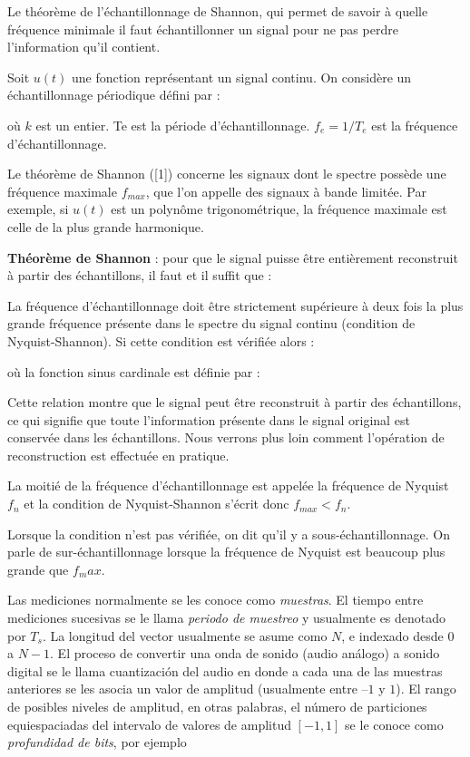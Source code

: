 \documentclass[conference,onecolumn]{IEEEtran}
\begin{document}
Le théorème de l'échantillonnage de Shannon, qui permet de savoir à quelle fréquence minimale il faut échantillonner un signal pour ne pas perdre l'information qu'il contient. 

Soit $u(t)$ une fonction représentant un signal continu. On considère un échantillonnage périodique défini par : 

où $k$ est un entier. Te est la période d'échantillonnage. $f_e=1/T_e$ est la fréquence d'échantillonnage. 

Le théorème de Shannon ([1]) concerne les signaux dont le spectre possède une fréquence maximale $f_{max}$, que l'on appelle des signaux à bande limitée. Par exemple, si $u(t)$ est un polynôme trigonométrique, la fréquence maximale est celle de la plus grande harmonique.

\textbf{Théorème de Shannon} : pour que le signal puisse être entièrement reconstruit à partir des échantillons, il faut et il suffit que : 

La fréquence d'échantillonnage doit être strictement supérieure à deux fois la plus grande fréquence présente dans le spectre du signal continu (condition de Nyquist-Shannon). Si cette condition est vérifiée alors : 

où la fonction sinus cardinale est définie par : 

Cette relation montre que le signal peut être reconstruit à partir des échantillons, ce qui signifie que toute l'information présente dans le signal original est conservée dans les échantillons. Nous verrons plus loin comment l'opération de reconstruction est effectuée en pratique. 

La moitié de la fréquence d'échantillonnage est appelée la fréquence de Nyquist $f_n$ et la condition de Nyquist-Shannon s'écrit donc $f_{max}<f_n$. 

Lorsque la condition n'est pas vérifiée, on dit qu'il y a sous-échantillonnage. On parle de sur-échantillonnage lorsque la fréquence de Nyquist est beaucoup plus grande que $f_max$. 

Las mediciones normalmente se les conoce como \textit{muestras}. El tiempo entre mediciones sucesivas se le llama \textit{periodo de muestreo} y usualmente es denotado por $T_s$. La longitud del vector usualmente se asume como $N$, e indexado desde $0$ a $N-1$. El proceso de convertir una onda de sonido (audio análogo) a sonido digital se le llama cuantización del audio en donde a cada una de las muestras anteriores se les asocia un valor de amplitud (usualmente entre $–1$ y $1$). El rango de posibles niveles de amplitud, en otras palabras, el número de particiones equiespaciadas del intervalo de valores de amplitud $[-1,1]$ se le conoce como \textit{profundidad de bits}, por ejemplo 
\end{document}
